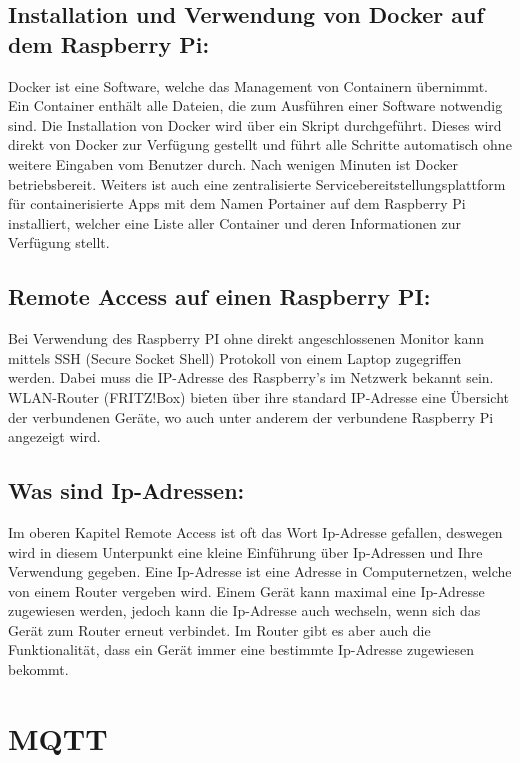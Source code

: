 \subsection {Installation und Verwendung von Docker auf dem Raspberry Pi:}

Docker ist eine Software, welche das Management von Containern übernimmt. Ein Container enthält alle Dateien, die zum Ausführen einer Software notwendig sind. 
Die Installation von Docker wird über ein Skript durchgeführt. 
Dieses wird direkt von Docker zur Verfügung gestellt und führt alle Schritte automatisch ohne weitere Eingaben vom Benutzer durch. 
Nach wenigen Minuten ist Docker betriebsbereit. 
Weiters ist auch eine zentralisierte Servicebereitstellungsplattform für containerisierte Apps 
mit dem Namen Portainer auf dem Raspberry Pi installiert, 
welcher eine Liste aller Container und deren Informationen zur Verfügung stellt.
 


\subsection {Remote Access auf einen Raspberry PI:}
Bei Verwendung des Raspberry PI ohne direkt angeschlossenen Monitor kann mittels SSH (Secure Socket Shell) Protokoll von einem Laptop zugegriffen werden.
Dabei muss die IP-Adresse des Raspberry's im Netzwerk bekannt sein. WLAN-Router (FRITZ!Box) bieten über ihre standard IP-Adresse eine Übersicht der verbundenen Geräte, wo auch unter anderem der verbundene Raspberry Pi angezeigt wird. 

 \subsection{Was sind Ip-Adressen:}
Im oberen Kapitel Remote Access ist oft das Wort Ip-Adresse gefallen, deswegen wird in diesem Unterpunkt eine kleine Einführung über Ip-Adressen und Ihre Verwendung gegeben. 
Eine Ip-Adresse ist eine Adresse in Computernetzen, welche von einem Router vergeben wird.
 Einem Gerät kann maximal eine Ip-Adresse zugewiesen werden, jedoch kann die Ip-Adresse auch wechseln, wenn sich das Gerät zum Router erneut verbindet. 
 Im Router gibt es aber auch die Funktionalität, dass ein Gerät immer eine bestimmte Ip-Adresse zugewiesen bekommt. 






\section{MQTT}

